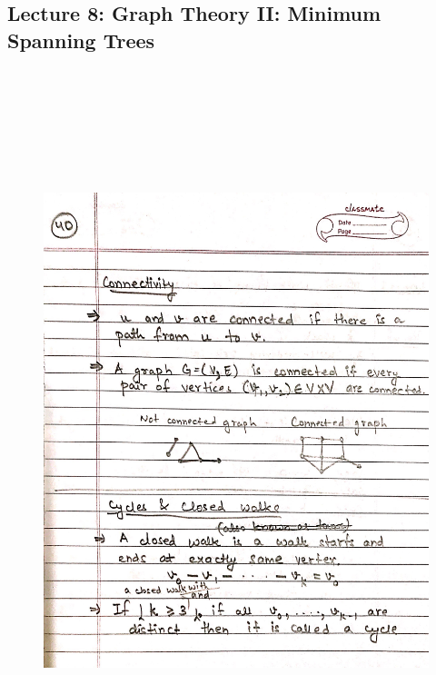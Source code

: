 \newpage
{\color{black} \subsection*{Lecture 8: Graph Theory II: Minimum Spanning Trees}}
\begin{figure}[H]
    \centering
    \includegraphics[width=16cm, height=21cm]{"./MIT-6.042J/MIT-6042J-040"}
\end{figure}

